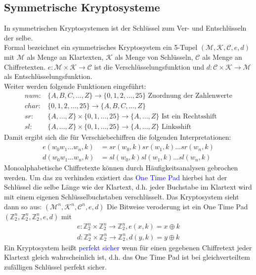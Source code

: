 \documentclass[a4paper,12pt,leqno]{article}
\newcommand{\blue}[1]{\textcolor{blue}{#1}}
\begin{document}
\subsection{Symmetrische Kryptosysteme}
In symmetrischen Kryptosystemen ist der Schlüssel zum Ver- und Entschlüsseln der selbe.\\
Formal bezeichnet ein symmetrisches Kryptosystem ein 5-Tupel $(\mathcal{M},\mathcal{K}, \mathcal{C},e,d)$ mit $\mathcal{M}$ als Menge an Klartexten, $\mathcal{K}$ als Menge von Schlüsseln, $\mathcal{C}$ als Menge an Chiffretexten.
$e: \mathcal{M}\times\mathcal{K}\rightarrow\mathcal{C}$ ist die Verschlüsselungsfunktion und $d: \mathcal{C}\times\mathcal{K}\rightarrow\mathcal{M}$ als Entschlüsselungsfunktion.\\
Weiter werden folgende Funktionen eingeführt:
\begin{align*}
num: & \{ A,B,C,...,Z\}\rightarrow\{ 0,1,2,...,25\} \textrm{ Zuordnung der Zahlenwerte}\\
char: & \{ 0,1,2,...,25\}\rightarrow\{ A,B,C,...,Z\}\\
sr: & \{A,...,Z\}\times\{0,1,...,25\}\rightarrow\{A,...,Z\} \textrm{ Ist ein Rechtsshift}\\
sl: & \{A,...,Z\}\times\{0,1,...,25\}\rightarrow\{A,...,Z\} \textrm{ Linksshift}
\end{align*}
Damit ergibt sich die für Verschiebechiffren die folgenden Interpretationen:
\begin{align*}
e(w_0w_1...w_n,k) &= sr(w_0,k)sr(w_1,k)...sr(w_n,k)\\
d(w_0w_1...w_n,k) &= sl(w_0,k)sl(w_1,k)...sl(w_n,k)
\end{align*}
Monoalphabetische Chiffretexte können durch Häufigkeitsanalysen gebrochen werden.
Um das zu verhinden existiert das \blue{One Time Pad} hierbei hat der Schlüssel die selbe Länge wie der Klartext, d.h. jeder Buchstabe im Klartext wird mit einem eigenen Schlüsselbuchstaben verschlüsselt. Das Kryptosystem sieht dann so aus: $(\mathcal{M}^n,\mathcal{K}^n, \mathcal{C}^n,e,d)$
Die Bitweise veroderung ist ein One Time Pad $(\mathbb{Z}_2^n,\mathbb{Z}_2^n,\mathbb{Z}_2^n,e,d)$ mit 
\begin{align*}
e:\mathbb{Z}_2^n\times\mathbb{Z}_2^n\rightarrow\mathbb{Z}_2^n,e(x,k)=x\oplus k\\
d:\mathbb{Z}_2^n\times\mathbb{Z}_2^n\rightarrow\mathbb{Z}_2^n,d(y,k)=y\oplus k
\end{align*}
Ein Kryptosystem heißt \blue{perfekt sicher} wenn für einen gegebenen Chiffretext jeder Klartext gleich wahrscheinlich ist, d.h. das One Time Pad ist bei gleichverteiltem zufälligen Schlüssel perfekt sicher.
\end{document}
